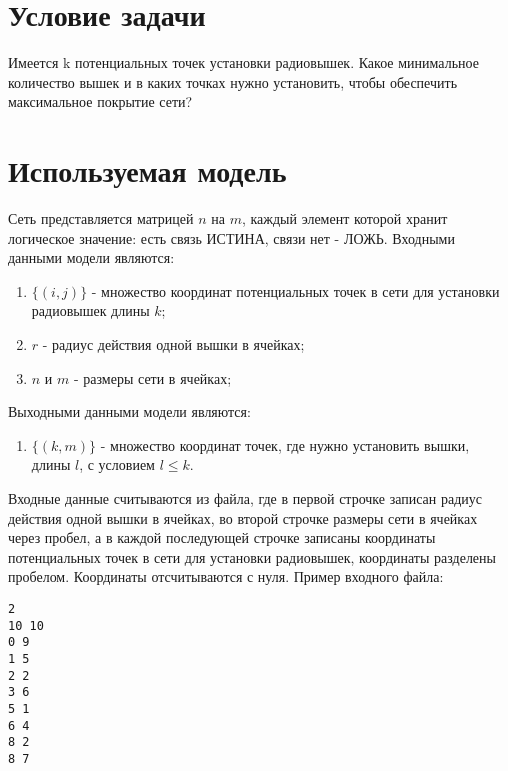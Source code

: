 \documentclass[russian,utf8,emptystyle]{eskdtext}
\begin{document}
%

\section{Условие задачи}
Имеется k потенциальных точек установки радиовышек. Какое минимальное количество вышек и в каких точках нужно установить, чтобы обеспечить максимальное покрытие сети?

\section{Используемая модель}
Сеть представляется матрицей $n$ на $m$, каждый элемент которой хранит логическое значение: есть связь ИСТИНА, связи нет - ЛОЖЬ. Входными данными модели являются:
\begin{enumerate}[label=\arabic*.]
\item $\{(i,j)\}$ - множество координат потенциальных точек в сети для установки радиовышек длины $k$;
\item $r$ - радиус действия одной вышки в ячейках;
\item $n$ и $m$ - размеры сети в ячейках;
\end{enumerate}

Выходными данными модели являются:
\begin{enumerate}[label=\arabic*.]
\item $\{(k,m)\}$ - множество координат точек, где нужно установить вышки, длины $l$, с условием $l \leq k$.
\end{enumerate}

Входные данные считываются из файла, где в первой строчке записан радиус действия одной вышки в ячейках, во второй строчке размеры сети в ячейках через пробел, а в каждой последующей строчке записаны координаты потенциальных точек в сети для установки радиовышек, координаты разделены пробелом. Координаты отсчитываются с нуля. Пример входного файла:
\begin{verbatim}
2
10 10
0 9
1 5
2 2
3 6
5 1
6 4
8 2
8 7
\end{verbatim}
\end{document}
